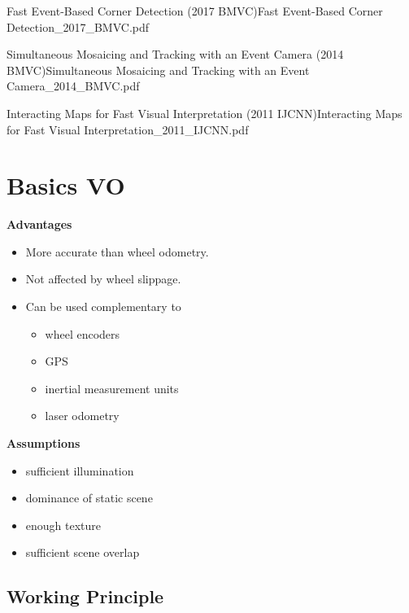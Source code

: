 \documentclass[10pt,a4paper]{scrartcl}
\begin{document}
\begin{multicols*}{2}
\begin{Paper}{Fast Event-Based Corner Detection (2017 BMVC)}{Fast Event-Based Corner Detection_2017_BMVC.pdf}
\end{Paper}

\begin{Paper}{Simultaneous Mosaicing and Tracking with an Event Camera (2014 BMVC)}{Simultaneous Mosaicing and Tracking with an Event Camera_2014_BMVC.pdf}
\end{Paper}

\begin{Paper}{Interacting Maps for Fast Visual Interpretation (2011 IJCNN)}{Interacting Maps for Fast Visual Interpretation_2011_IJCNN.pdf}
\end{Paper}

\section{Basics VO}

\textbf{Advantages}
\begin{itemize}
\item More accurate than wheel odometry.
\item Not affected by wheel slippage.
\item Can be used complementary to
\begin{itemize}
\item wheel encoders
\item GPS
\item inertial measurement units
\item laser odometry
\end{itemize}
\end{itemize}

\textbf{Assumptions}
\begin{itemize}
\item sufficient illumination
\item dominance of static scene
\item enough texture
\item sufficient scene overlap
\end{itemize}

\subsection{Working Principle}



\end{multicols*}
\end{document}
